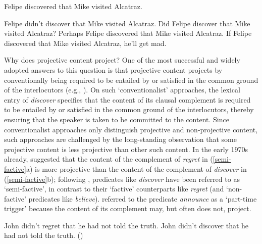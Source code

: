 \documentclass[11pt,fleqn]{article}
\newcommand{\6}{\mbox{$[\hspace*{-.6mm}[$}}
\newcommand{\9}{\mbox{$]\hspace*{-.6mm}]$}}
\begin{document}
\begin{exe}
\ex\label{eng1}  Felipe discovered that Mike visited Alcatraz.

\ex\label{eng2}
\begin{xlist} 
\ex Felipe didn't discover that Mike visited Alcatraz.
\ex Did Felipe discover that Mike visited Alcatraz?
\ex Perhaps Felipe discovered that Mike visited Alcatraz.
\ex If Felipe discovered that Mike visited Alcatraz, he'll get mad.
\end{xlist}
\end{exe}

Why does projective content project? One of the most successful and widely adopted answers to this question is that projective content projects by conventionally being required to be entailed by or satisfied in the common ground of the interlocutors (e.g., \citealt{heim83,vds92,geurts99}). On such `conventionalist' approaches, the lexical entry of {\em discover} specifies that the content of its clausal complement is required to be entailed by or satisfied in the common ground of the interlocutors, thereby ensuring that the speaker is taken to be committed to the content. Since conventionalist approaches only distinguish projective and non-projective content, such approaches are challenged by the long-standing observation that some projective content is less projective than other such content. In the early 1970s already, \citet{karttunen71b} suggested that the content of the complement of {\em regret} in (\ref{semi-factive}a) is more projective than the content of the complement of {\em discover} in (\ref{semi-factive}b); following \citealt{karttunen71b}, predicates like {\em discover} have been referred to as `semi-factive', in contrast to their `factive' counterparts like {\em regret} (and `non-factive' predicates like {\em believe}). \citet{schlenker10} referred to the predicate {\em announce} as a `part-time trigger' because the content of its complement may, but often does not, project.

\begin{exe}
\ex\label{semi-factive}
\begin{xlist}
\ex John didn't regret that he had not told the truth.
\ex John didn't discover that he had not told the truth.  
\hfill (\citealt[63]{karttunen71b})

\end{xlist}
\end{exe}
\end{document}
